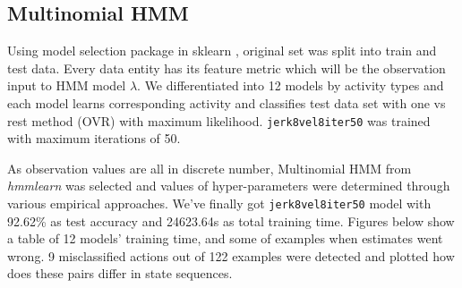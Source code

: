 \documentclass[10pt,twocolumn,letterpaper]{article}
\begin{document}
\subsection{Multinomial HMM}
Using model selection package in sklearn \cite{sklearn}, original set was split into train and test data. Every data entity has its feature metric which will be the observation input to HMM model $\lambda$. We differentiated into 12 models by activity types and each model learns corresponding activity and classifies test data set with one vs rest method (OVR) with maximum likelihood. \texttt{jerk8vel8iter50} was trained with maximum iterations of 50.

As observation values are all in discrete number, Multinomial HMM from \textit{hmmlearn} was selected and values of hyper-parameters were determined through various empirical approaches. We've finally got \texttt{jerk8vel8iter50} model with 92.62\% as test accuracy and 24623.64s as total training time. Figures below show a table of 12 models' training time, and some of examples when estimates went wrong. 9 misclassified actions out of 122 examples were detected and plotted how does these pairs differ in state sequences.
\end{document}
